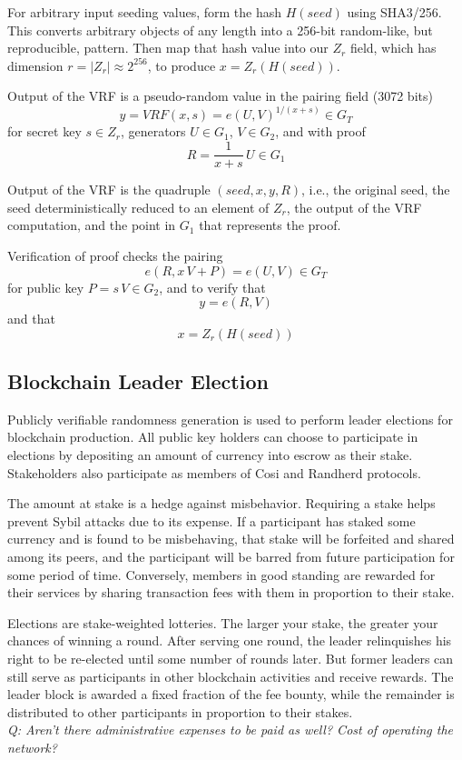 \documentclass{yellowpaper}
\begin{document}
For arbitrary input seeding values, form the hash $H(seed)$ using SHA3/256. This converts arbitrary objects of any length into a 256-bit random-like, but reproducible, pattern. Then map that hash value into our $Z_r$ field, which has dimension $r = |Z_r| \approx 2^{256}$, to produce $x = Z_r(H(seed))$.

Output of the VRF is a pseudo-random value in the pairing field (3072 bits) 
$$y = VRF(x, s) = e(U,V)^{1/(x + s)} \in G_T$$ 
for secret key $s \in Z_r$,  generators $U \in G_1$, $V \in G_2$, and with proof 
$$R = \frac{1}{x+s}\,U \in G_1$$ 

Output of the VRF is the quadruple $(seed, x, y, R)$, i.e., the original seed, the seed deterministically reduced to an element of $Z_r$, the output of the VRF computation, and the point in $G_1$ that represents the proof.

Verification of proof checks the pairing $$e(R, x \, V + P) = e(U,V)  \in G_T$$ for public key $P = s \, V \in G_2$, and to verify that $$y = e(R,V)$$ and that $$x = Z_r(H(seed))$$
\subsection{Blockchain Leader Election}
Publicly verifiable randomness generation is used to perform leader elections for blockchain production. All public key holders can choose to participate in elections by depositing an amount of currency into escrow as their stake. Stakeholders also participate as members of Cosi and Randherd protocols.

The amount at stake is a hedge against misbehavior.  Requiring a stake helps prevent Sybil attacks due to its expense. If a participant has staked some currency and is found to be misbehaving, that stake will be forfeited and shared among its peers, and the participant will be barred from future participation for some period of time. Conversely, members in good standing are rewarded for their services by sharing transaction fees with them in proportion to their stake.

Elections are stake-weighted lotteries. The larger your stake, the greater your chances of winning a round. After serving one round, the leader relinquishes his right to be re-elected until some number of rounds later. But former leaders can still serve as participants in other blockchain activities and receive rewards. The leader block is awarded a fixed fraction of the fee bounty, while the remainder is distributed to other participants in proportion to their stakes.
$$
$$
{\em{Q: Aren't there administrative expenses to be paid as well? Cost of operating the network?}}
$$
$$
\end{document}
